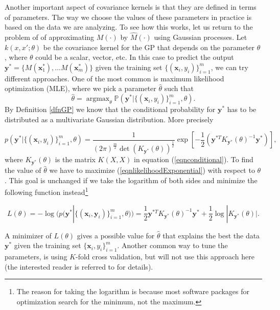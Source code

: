 \documentclass{sfuthesis}
\newcommand{\p}{\mathbb{P}}
\newcommand{\x}{\textbf{x}}
\newcommand{\y}{\textbf{y}}
\newcommand{\argmax}{\mathop{\mathrm{argmax}}}
\begin{document}
Another important aspect of covariance kernels is that they are  defined in terms of parameters. 
The way we choose the values of these parameters in practice is based on the data
we are analyzing. To see how this works, let us return to the problem of of approximating $M(\cdot)$
by $\widehat{M}(\cdot)$ using Gaussian processes. Let   $k(x,x';\theta)$ be the covariance
kernel for the GP that depends on the parameter $\theta$, where
$\theta$ could be a scalar, vector, etc. In this case to predict the output
$\y^{*}=\{M(\x_{1}^{*}),\ldots M(\x_{m}^{*})\}$ given the training set $\{(\x_{i},y_{i})\}_{i=1}^{m}$, 
we can try different approaches. One of the most common is maximum likelihood optimization (MLE), where 
we pick a parameter $\hat{\theta}$ such that
\begin{equation*}
\hat{\theta}=\argmax_{\theta}\p(\y^{*}|\{(\x_{i},y_{i})\}_{i=1}^{m},\theta).
\end{equation*}
By Definition \ref{dfnGP} we know that the conditional probability for $\y^{*}$ has to be distributed as
a multivariate Gaussian distribution. More precisely

\begin{equation}\label{eqnlikelihoodExponential}
p(\y^{*}|\{(\x_{i},y_{i})\}_{i=1}^{m},\theta)=\frac{1}{(2\pi)^{\frac{m}{2}}\det(K_{\y^{*}}(\theta))^{\frac{1}{2}}}
\exp\left[-\frac{1}{2}(\y^{*T}K_{\y^{*}}(\theta)^{-1}\y^{*})\right],
\end{equation}
where $K_{\y^{*}}(\theta)$ is the matrix $K(X,X)$ in equation (\ref{eqnconditional}). 
To find the value of $\hat{\theta}$ we have to maximize (\ref{eqnlikelihoodExponential})
with respect to $\theta$.
This goal is unchanged if we take the logarithm of  both sides and minimize the following
function instead\footnote{The reason for taking the logarithm is because most
software packages for optimization search for the minimum, not the maximum.}


\begin{equation}\label{eqnloglikelihood}
L(\theta)=-\log(p(\y^{*}|\{(\x_{i},\y_{i})\}_{i=1}^{m},\theta))=\frac{1}{2}\y^{*T}K_{\y^{*}}(\theta)^{-1}\y^{*}+
\frac{1}{2}\log|K_{\y^{*}}(\theta)|.
\end{equation}

A minimizer of $L(\theta)$   gives  a possible value for $\hat{\theta}$
that explains the best the data $\y^{*}$ given the training set $\{\x_{i},y_{i}\}_{i=1}^{m}$.  
Another common way to tune the parameters,
is using  $K$-fold cross validation, but will not use this approach here (the interested
reader is referred to \cite{murphy2012machine} for details).
\newline
\end{document}
